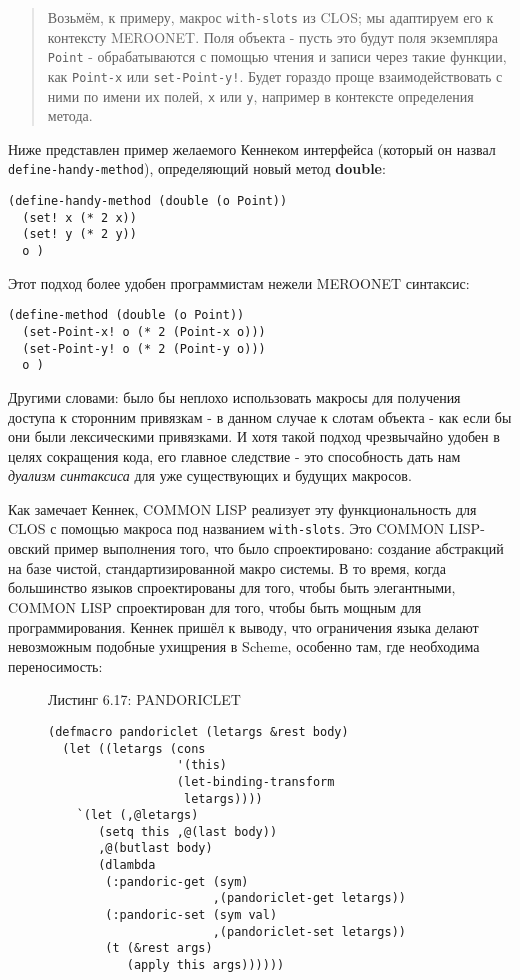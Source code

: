 \begin{quote}Возьмём, к примеру, макрос \verb"with-slots" из CLOS; мы адаптируем его к контексту MEROONET. Поля объекта - пусть это будут поля экземпляра \verb"Point" - обрабатываются с помощью чтения и записи через такие функции, как \verb"Point-x" или \verb"set-Point-y!". Будет гораздо проще взаимодействовать с ними по имени их полей, \verb"x" или \verb"y", например в контексте определения метода.\end{quote}

Ниже представлен пример желаемого Кеннеком интерфейса (который он назвал \verb"define-handy-method"), определяющий новый метод {\Eng\textbf{double}}:

\begin{verbatim}
(define-handy-method (double (o Point))
  (set! x (* 2 x))
  (set! y (* 2 y))
  o )
\end{verbatim}

Этот подход более удобен программистам нежели MEROONET синтаксис:

\begin{verbatim}
(define-method (double (o Point))
  (set-Point-x! o (* 2 (Point-x o)))
  (set-Point-y! o (* 2 (Point-y o)))
  o )
\end{verbatim}

Другими словами: было бы неплохо использовать макросы для получения доступа к сторонним привязкам - в данном случае к слотам объекта - как если бы они были лексическими привязками. И хотя такой подход чрезвычайно удобен в целях сокращения кода, его главное следствие - это способность дать нам \emph{дуализм синтаксиса} для уже существующих и будущих макросов.

Как замечает Кеннек, COMMON LISP реализует эту функциональность для CLOS с помощью макроса под названием \verb"with-slots". Это COMMON LISP-овский пример выполнения того, что было спроектировано: создание абстракций на базе чистой, стандартизированной макро системы. В то время, когда большинство языков спроектированы для того, чтобы быть элегантными, COMMON LISP спроектирован для того, чтобы быть мощным для программирования. Кеннек пришёл к выводу, что ограничения языка делают невозможным подобные ухищрения в Scheme, особенно там, где необходима переносимость:

\begin{figure}Листинг 6.17: PANDORICLET\label{listing_6.17}
\listbegin
\begin{verbatim}
(defmacro pandoriclet (letargs &rest body)
  (let ((letargs (cons
                  '(this)
                  (let-binding-transform
                   letargs))))
    `(let (,@letargs)
       (setq this ,@(last body))
       ,@(butlast body)
       (dlambda
        (:pandoric-get (sym)
                       ,(pandoriclet-get letargs))
        (:pandoric-set (sym val)
                       ,(pandoriclet-set letargs))
        (t (&rest args)
           (apply this args))))))
\end{verbatim}
\listend
\end{figure}

